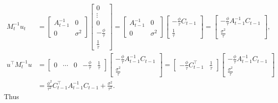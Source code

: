 \begin{align*}
M_{t}^{-1} u_{t} &=\left[ \begin{array}{cc} A_{t-1}^{-1} & 0 \\ 0 & \sigma^2 \end{array} \right] \left[ \begin{array}{c}  0 \\ \vdots \\0 \\ -\frac{\phi}{\tau} \\\frac{1}{\tau} \end{array} \right] =
\left[ \begin{array}{cc} A_{t-1}^{-1} & 0 \\ 0 & \sigma^2 \end{array} \right] \left[ \begin{array}{c} -\frac{\phi}{\tau} C_{t-1} \\ \frac{1}{\tau}\end{array} \right] = \left[ \begin{array}{c} -\frac{\phi}{\tau} A_{t-1}^{-1}C_{t-1} \\ \frac{\sigma^2}{\tau}\end{array} \right] ,\\
u^\top M_{t}^{-1}  u &=\left[ \begin{array}{ccccc}  0 & \cdots & 0 & -\frac{\phi}{\tau} & \frac{1}{\tau} \end{array} \right] \left[ \begin{array}{c} -\frac{\phi}{\tau} A_{t-1}^{-1}C_{t-1} \\ \frac{\sigma^2}{\tau} \end{array} \right] =  \left[ \begin{array}{cc} -\frac{\phi}{\tau} C_{t-1}^\top & \frac{1}{\tau}\end{array} \right]  \left[ \begin{array}{c} -\frac{\phi}{\tau} A_{t-1}^{-1}C_{t-1} \\ \frac{\sigma^2}{\tau}\end{array} \right] \\ &=\frac{\phi^2}{\tau^2} C_{t-1}^\top A_{t-1}^{-1}C_{t-1}+\frac{\sigma^2}{\tau^2}.
\end{align*}
Thus
